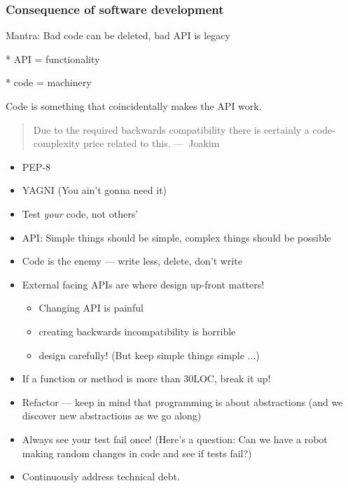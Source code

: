 \documentclass{beamer}
\begin{document}
\begin{frame}
  \frametitle{Consequence of software development}

  Mantra: Bad code can be deleted, bad API is legacy

  * API = functionality

  * code = machinery

  Code is something that coincidentally makes the API work.

  \begin{quote}
    Due to the required backwards compatibility there is certainly a
    code-complexity price related to this.  ---~Joakim
  \end{quote}
\end{frame}

\begin{frame}
  \begin{itemize}
  \item PEP-8
  \item YAGNI (You ain't gonna need it)
  \item Test \emph{your} code, not others'
  \item API: Simple things should be simple, complex things should be possible
  \item Code is the enemy --- write less, delete, don't write
  \item External facing APIs are where design up-front matters!
    \begin{itemize}
    \item Changing API is painful
    \item creating backwards incompatibility is horrible
    \item design carefully! (But keep simple things simple ...)
    \end{itemize}
  \item If a function or method is more than 30LOC, break it up!
  \item Refactor --- keep in mind that programming is about abstractions (and we
    discover new abstractions as we go along)
  \item Always see your test fail once!  (Here's a question: Can we have a robot
    making random changes in code and see if tests fail?)
  \item Continuously address technical debt.
  \end{itemize}
\end{frame}
\end{document}
